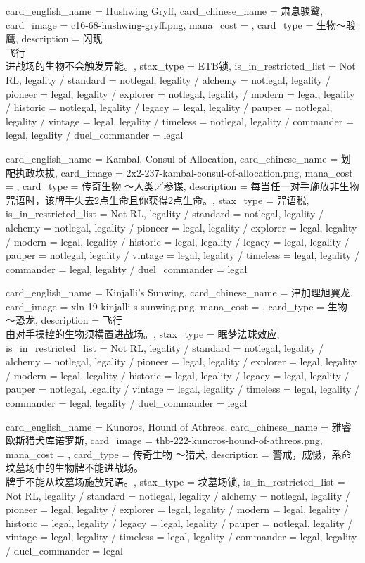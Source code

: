 \documentclass[lang = cn, color = black, 10pt]{AllThatStax}
\begin{document}
\card
{
	card_english_name = {Hushwing Gryff},
	card_chinese_name = {肃息骏鹭},
	card_image = c16-68-hushwing-gryff.png,
	mana_cost = ,
	card_type = 生物～骏鹰,
	description = {闪现\\
		飞行\\
		进战场的生物不会触发异能。},
	stax_type = ETB锁,
	is_in_restricted_list = Not RL,
	legality / standard = notlegal,
	legality / alchemy = notlegal,
	legality / pioneer = legal,
	legality / explorer = notlegal,
	legality / modern = legal,
	legality / historic = notlegal,
	legality / legacy = legal,
	legality / pauper = notlegal,
	legality / vintage = legal,
	legality / timeless = notlegal,
	legality / commander = legal,
	legality / duel_commander = legal
}

\card
{
	card_english_name = {Kambal, Consul of Allocation},
	card_chinese_name = {划配执政坎拔},
	card_image = 2x2-237-kambal-consul-of-allocation.png,
	mana_cost = ,
	card_type = 传奇生物 ～人类／参谋,
	description = {每当任一对手施放非生物咒语时，该牌手失去2点生命且你获得2点生命。},
	stax_type = 咒语税,
	is_in_restricted_list = Not RL,
	legality / standard = notlegal,
	legality / alchemy = notlegal,
	legality / pioneer = legal,
	legality / explorer = legal,
	legality / modern = legal,
	legality / historic = legal,
	legality / legacy = legal,
	legality / pauper = notlegal,
	legality / vintage = legal,
	legality / timeless = legal,
	legality / commander = legal,
	legality / duel_commander = legal
}

\card
{
	card_english_name = {Kinjalli's Sunwing},
	card_chinese_name = {津加理旭翼龙},
	card_image = xln-19-kinjalli-s-sunwing.png,
	mana_cost = ,
	card_type = 生物 ～恐龙,
	description = {飞行\\
		由对手操控的生物须横置进战场。},
	stax_type = 眠梦法球效应,
	is_in_restricted_list = Not RL,
	legality / standard = notlegal,
	legality / alchemy = notlegal,
	legality / pioneer = legal,
	legality / explorer = legal,
	legality / modern = legal,
	legality / historic = legal,
	legality / legacy = legal,
	legality / pauper = notlegal,
	legality / vintage = legal,
	legality / timeless = legal,
	legality / commander = legal,
	legality / duel_commander = legal
}

\card
{
	card_english_name = {Kunoros, Hound of Athreos},
	card_chinese_name = {雅睿欧斯猎犬库诺罗斯},
	card_image = thb-222-kunoros-hound-of-athreos.png,
	mana_cost = ,
	card_type = 传奇生物 ～猎犬,
	description = {警戒，威慑，系命\\
		坟墓场中的生物牌不能进战场。\\
		牌手不能从坟墓场施放咒语。},
	stax_type = 坟墓场锁,
	is_in_restricted_list = Not RL,
	legality / standard = notlegal,
	legality / alchemy = notlegal,
	legality / pioneer = legal,
	legality / explorer = legal,
	legality / modern = legal,
	legality / historic = legal,
	legality / legacy = legal,
	legality / pauper = notlegal,
	legality / vintage = legal,
	legality / timeless = legal,
	legality / commander = legal,
	legality / duel_commander = legal
}
\end{document}

